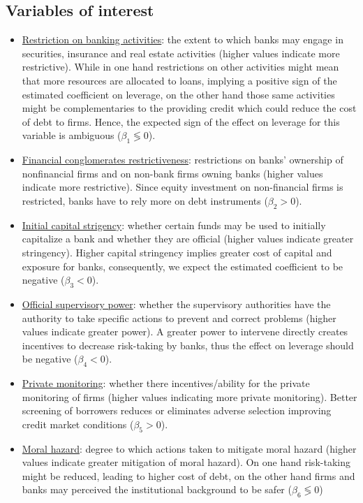 \documentclass[12pt]{article}
\begin{document}
	\subsection{Variables of interest} \label{sec:variables of interest}
	 \begin{itemize}
	 	\item \underline{Restriction on banking activities}: the extent to which banks may engage in securities, insurance and real estate activities (higher values indicate more restrictive). While in one hand restrictions on other activities might mean that more resources are allocated to loans, implying a positive sign of the estimated coefficient on leverage, on the other hand those same activities might be complementaries to the providing credit which could reduce the cost of debt to firms. Hence, the expected sign of the effect on leverage for this variable is ambiguous ($\beta_1\lessgtr0$).  
	 	\item \underline{Financial conglomerates restrictiveness}: restrictions on banks' ownership of nonfinancial firms and on non-bank firms owning banks (higher values indicate more restrictive). Since equity investment on non-financial firms is restricted, banks have to rely more on debt instruments ($\beta_2>0$).
	 	\item  \underline{Initial capital strigency}: whether certain funds may be used to initially capitalize a bank and whether they are official (higher values indicate greater stringency). Higher capital stringency implies greater cost of capital and exposure for banks, consequently, we expect the estimated coefficient to be negative ($\beta_3<0$).
	 	\item \underline{Official supervisory power}: whether the supervisory authorities have the authority to take specific actions to prevent and correct problems (higher values indicate greater power). A greater power to intervene directly creates incentives to decrease risk-taking by banks, thus the effect on leverage should be negative ($\beta_4<0$).
	 	\item \underline{Private monitoring}: whether there incentives/ability for the private monitoring of firms (higher values indicating more private monitoring). Better screening of borrowers reduces or eliminates adverse selection improving credit market conditions ($\beta_5>0$).
	 	\item \underline{Moral hazard}: degree to which actions taken to mitigate moral hazard (higher values indicate greater mitigation of moral hazard). On one hand risk-taking might be reduced, leading to higher cost of debt, on the other hand firms and banks may perceived the institutional background to be safer ($\beta_6\lessgtr0$)
	 \end{itemize}
 
\end{document}
